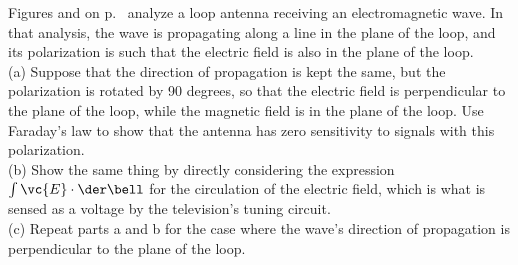 Figures  and  on p.~\pageref{fig:faraday-em-wave}
analyze a loop antenna receiving an electromagnetic wave. In that analysis, the 
wave is propagating along a line in the plane of the loop, and its polarization
is such that the electric field is also in the plane of the loop.\\
(a) Suppose that the direction of propagation is kept the same, but the polarization
is rotated by 90 degrees, so that the electric field is perpendicular to the plane
of the loop, while the magnetic field is in the plane of the loop. Use Faraday's
law to show that the antenna has zero sensitivity to signals with this polarization.\\
(b) Show the same thing by directly considering the expression $\int\vc{E}\cdot\der\bell$
for the circulation of the electric field, which is what is sensed as a voltage
by the television's tuning circuit.\\
(c) Repeat parts a and b for the case where the wave's direction of propagation is
perpendicular to the plane of the loop.
